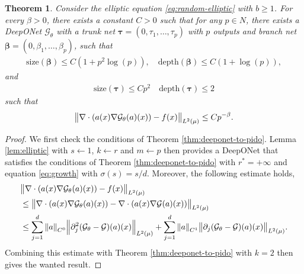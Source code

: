 \documentclass{article}
\numberwithin{equation}{section}
\newcommand{\size}{\mathrm{size}}
\newcommand{\depth}{\mathrm{depth}}
\newcommand{\cG}{\mathcal{G}}
\renewcommand{\tr}{{{\tau}}}
\newcommand{\trunk}{{\bm{\tau}}}
\newcommand{\branch}{{\bm{\beta}}}
\newcommand{\1}{\mathbbm{1}}
\newtheorem{theorem}{Theorem}[section]
\begin{document}
\begin{theorem}\label{thm:pido-elliptic}
Consider the elliptic equation \eqref{eq:random-elliptic} with $b\geq1$. For every $\beta>0$, there exists a constant $C>0$ such that for any $p\in N$, there exists a DeepONet $\cG_\theta$ with a trunk net $\trunk = (0,\tr_1, \dots, \tr_p)$ with $p$ outputs and branch net $\branch = (0,\beta_1,\dots, \beta_p)$, such that 
\begin{gather}
\size(\branch) \le C(1+p^2 \log(p)), \quad
\depth(\branch) \le C(1+ \log(p)),
\end{gather}
and
\begin{gather}
\size(\trunk) \le Cp^2 \quad
\depth(\trunk) \le 2
\end{gather}
such that
\begin{equation}
    \norm{\nabla \cdot (a(x) \nabla \cG_\theta(a)(x)) - f(x)}_{L^2(\mu)} \leq C p^{-\beta}. 
\end{equation}
\end{theorem}

\begin{proof}
We first check the conditions of Theorem \ref{thm:deeponet-to-pido}. Lemma \ref{lem:elliptic} with $s\leftarrow 1$, $k\leftarrow r$ and $m\leftarrow p$ then provides a DeepONet that satisfies the conditions of Theorem \ref{thm:deeponet-to-pido}  with $r^*=+\infty$ and equation \eqref{eq:growth} with $\sigma(s)=s/d$. Moreover, the following estimate holds, 
\begin{align}
\begin{split}
    &\norm{\nabla \cdot (a(x) \nabla \cG_\theta(a)(x)) - f(x)}_{L^2(\mu)}\\
    &\leq \norm{\nabla \cdot (a(x) \nabla \cG_\theta(a)(x)) - \nabla \cdot (a(x) \nabla \cG(a)(x))}_{L^2(\mu)}\\
    &\leq \sum_{j=1}^d \norm{a}_{C^0} \norm{\partial_j^2 (\cG_\theta-\cG)(a)(x)}_{L^2(\mu)} + \sum_{j=1}^d \norm{a}_{C^1} \norm{\partial_j (\cG_\theta-\cG)(a)(x)}_{L^2(\mu)}. 
\end{split}
\end{align}
Combining this estimate with Theorem \ref{thm:deeponet-to-pido} with $k=2$ then gives the wanted result. 
\end{proof}
\end{document}
